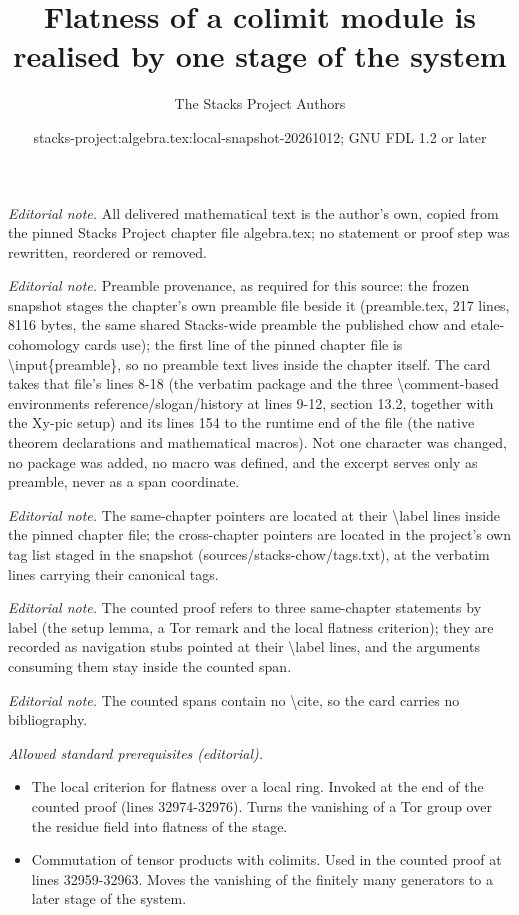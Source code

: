 \documentclass[10pt,a4paper]{amsart}
\title{Flatness of a colimit module is realised by one stage of the system}
\author{The Stacks Project Authors}
\date{stacks-project:algebra.tex:local-snapshot-20261012; GNU FDL 1.2 or later}
\theoremstyle{plain}
\theoremstyle{definition}
\theoremstyle{remark}
\numberwithin{equation}{subsection}
\begin{document}
\maketitle
\noindent\textit{Editorial note.} All delivered mathematical text is the author's own, copied from the pinned Stacks Project chapter file algebra.tex; no statement or proof step was rewritten, reordered or removed.\par\medskip
\noindent\textit{Editorial note.} Preamble provenance, as required for this source: the frozen snapshot stages the chapter's own preamble file beside it (preamble.tex, 217 lines, 8116 bytes, the same shared Stacks-wide preamble the published chow and etale-cohomology cards use); the first line of the pinned chapter file is \textbackslash{}input\{preamble\}, so no preamble text lives inside the chapter itself. The card takes that file's lines 8-18 (the verbatim package and the three \textbackslash{}comment-based environments reference/slogan/history at lines 9-12, section 13.2, together with the Xy-pic setup) and its lines 154 to the runtime end of the file (the native theorem declarations and mathematical macros). Not one character was changed, no package was added, no macro was defined, and the excerpt serves only as preamble, never as a span coordinate.\par\medskip
\noindent\textit{Editorial note.} The same-chapter pointers are located at their \textbackslash{}label lines inside the pinned chapter file; the cross-chapter pointers are located in the project's own tag list staged in the snapshot (sources/stacks-chow/tags.txt), at the verbatim lines carrying their canonical tags.\par\medskip
\noindent\textit{Editorial note.} The counted proof refers to three same-chapter statements by label (the setup lemma, a Tor remark and the local flatness criterion); they are recorded as navigation stubs pointed at their \textbackslash{}label lines, and the arguments consuming them stay inside the counted span.\par\medskip
\noindent\textit{Editorial note.} The counted spans contain no \textbackslash{}cite, so the card carries no bibliography.\par\medskip
\noindent\textit{Allowed standard prerequisites (editorial).}\begin{itemize}
\item The local criterion for flatness over a local ring. Invoked at the end of the counted proof (lines 32974-32976). Turns the vanishing of a Tor group over the residue field into flatness of the stage.
\item Commutation of tensor products with colimits. Used in the counted proof at lines 32959-32963. Moves the vanishing of the finitely many generators to a later stage of the system.
\end{itemize}\medskip
\end{document}
